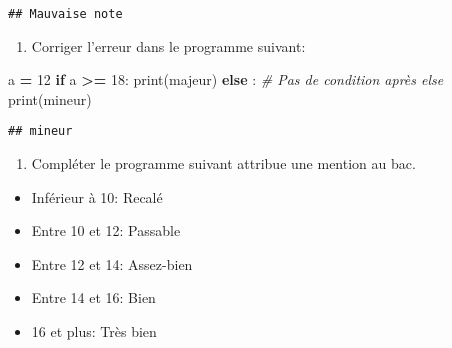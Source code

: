 \documentclass[
]{book}
\newenvironment{Shaded}{\begin{snugshade}}{\end{snugshade}}
\newcommand{\BuiltInTok}[1]{#1}
\newcommand{\CommentTok}[1]{\textcolor[rgb]{0.56,0.35,0.01}{\textit{#1}}}
\newcommand{\ControlFlowTok}[1]{\textcolor[rgb]{0.13,0.29,0.53}{\textbf{#1}}}
\newcommand{\DecValTok}[1]{\textcolor[rgb]{0.00,0.00,0.81}{#1}}
\newcommand{\NormalTok}[1]{#1}
\newcommand{\OperatorTok}[1]{\textcolor[rgb]{0.81,0.36,0.00}{\textbf{#1}}}
\newcommand{\StringTok}[1]{\textcolor[rgb]{0.31,0.60,0.02}{#1}}
\providecommand{\tightlist}{%
  \setlength{\itemsep}{0pt}\setlength{\parskip}{0pt}}
\def\tightlist{}
\begin{document}
\begin{verbatim}
## Mauvaise note
\end{verbatim}

\begin{enumerate}
\def\labelenumi{\arabic{enumi}.}
\setcounter{enumi}{2}
\tightlist
\item
  Corriger l'erreur dans le programme suivant:
\end{enumerate}

\begin{Shaded}
\begin{Highlighting}[]
\NormalTok{a }\OperatorTok{=} \DecValTok{12}
\ControlFlowTok{if}\NormalTok{ a }\OperatorTok{\textgreater{}=} \DecValTok{18}\NormalTok{:}
  \BuiltInTok{print}\NormalTok{(}\StringTok{\textquotesingle{}majeur\textquotesingle{}}\NormalTok{)}
\ControlFlowTok{else}\NormalTok{ : }\CommentTok{\# Pas de condition après else}
  \BuiltInTok{print}\NormalTok{(}\StringTok{\textquotesingle{}mineur\textquotesingle{}}\NormalTok{)}
\end{Highlighting}
\end{Shaded}

\begin{verbatim}
## mineur
\end{verbatim}

\begin{enumerate}
\def\labelenumi{\arabic{enumi}.}
\setcounter{enumi}{3}
\tightlist
\item
  Compléter le programme suivant attribue une mention au bac.
\end{enumerate}

\begin{itemize}
\tightlist
\item
  Inférieur à 10: Recalé
\item
  Entre 10 et 12: Passable
\item
  Entre 12 et 14: Assez-bien
\item
  Entre 14 et 16: Bien
\item
  16 et plus: Très bien
\end{itemize}
\end{document}

